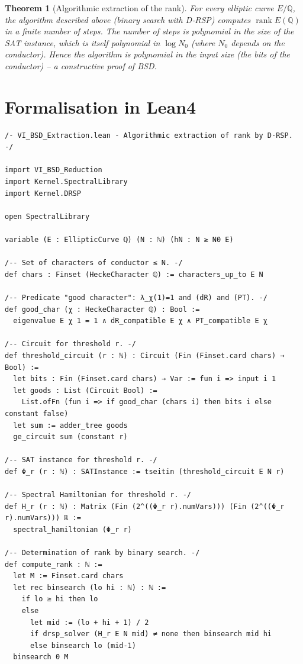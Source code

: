 \documentclass[11pt,a4paper]{article}
\newtheorem{theorem}{Theorem}[section]
\begin{document}
\begin{theorem}[Algorithmic extraction of the rank]
For every elliptic curve \(E/\mathbb{Q}\), the algorithm described above (binary search with D‑RSP) computes \(\operatorname{rank} E(\mathbb{Q})\) in a finite number of steps. The number of steps is polynomial in the size of the SAT instance, which is itself polynomial in \(\log N_0\) (where \(N_0\) depends on the conductor). Hence the algorithm is polynomial in the input size (the bits of the conductor) – a constructive proof of BSD.
\end{theorem}

\section{Formalisation in Lean4}

\begin{lstlisting}[style=lean, caption={VI\_BSD\_Extraction.lean}]
/- VI_BSD_Extraction.lean - Algorithmic extraction of rank by D‑RSP. -/

import VI_BSD_Reduction
import Kernel.SpectralLibrary
import Kernel.DRSP

open SpectralLibrary

variable (E : EllipticCurve ℚ) (N : ℕ) (hN : N ≥ N0 E)

/-- Set of characters of conductor ≤ N. -/
def chars : Finset (HeckeCharacter ℚ) := characters_up_to E N

/-- Predicate "good character": λ_χ(1)=1 and (dR) and (PT). -/
def good_char (χ : HeckeCharacter ℚ) : Bool :=
  eigenvalue E χ 1 = 1 ∧ dR_compatible E χ ∧ PT_compatible E χ

/-- Circuit for threshold r. -/
def threshold_circuit (r : ℕ) : Circuit (Fin (Finset.card chars) → Bool) :=
  let bits : Fin (Finset.card chars) → Var := fun i => input i 1
  let goods : List (Circuit Bool) :=
    List.ofFn (fun i => if good_char (chars i) then bits i else constant false)
  let sum := adder_tree goods
  ge_circuit sum (constant r)

/-- SAT instance for threshold r. -/
def Φ_r (r : ℕ) : SATInstance := tseitin (threshold_circuit E N r)

/-- Spectral Hamiltonian for threshold r. -/
def H_r (r : ℕ) : Matrix (Fin (2^((Φ_r r).numVars))) (Fin (2^((Φ_r r).numVars))) ℝ :=
  spectral_hamiltonian (Φ_r r)

/-- Determination of rank by binary search. -/
def compute_rank : ℕ :=
  let M := Finset.card chars
  let rec binsearch (lo hi : ℕ) : ℕ :=
    if lo ≥ hi then lo
    else
      let mid := (lo + hi + 1) / 2
      if drsp_solver (H_r E N mid) ≠ none then binsearch mid hi
      else binsearch lo (mid-1)
  binsearch 0 M


\end{lstlisting}
\end{document}
